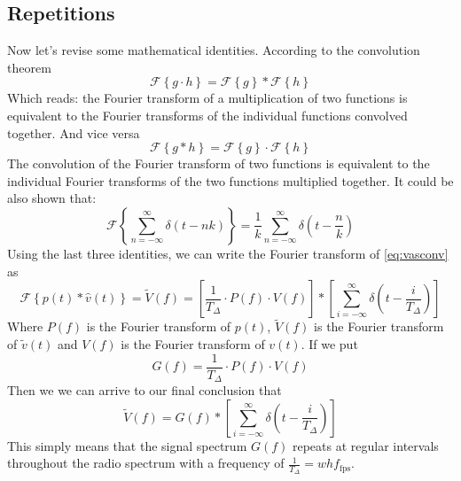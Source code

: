 \documentclass[a4paper,12pt,twoside,openright]{report}
\begin{document}
\subsection{Repetitions}
Now let's revise some mathematical identities. According to the convolution theorem \cite{arfkenconvolution}
\begin{equation}
\mathcal{F} \left\{ g \cdot h \right\} = \mathcal{F} \left\{ g \right\} \ast  \mathcal{F} \left\{ h \right\}
\end{equation}
Which reads: the Fourier transform of a multiplication of two functions is equivalent to the Fourier transforms of the individual functions convolved together. And vice versa
\begin{equation}
\mathcal{F} \left\{ g \ast h \right\} = \mathcal{F} \left\{ g \right\} \cdot  \mathcal{F} \left\{ h \right\}
\end{equation}
The convolution of the Fourier transform of two functions is equivalent to the individual Fourier transforms of the two functions multiplied together.
It could be also shown that:
\begin{equation}
\mathcal{F} \left\{ \sum\limits_{n=-\infty}^{\infty}  \delta(t-n k) \right\} = \frac{1}{k} \sum\limits_{n=-\infty}^{\infty}  \delta \left( t-\frac{n}{k} \right)
\end{equation}
Using the last three identities, we can write the Fourier transform of \ref{eq:vasconv} as
\begin{equation} 
\mathcal{F} \left\{ p(t) \ast \hat{v}(t) \right\} = \tilde{V}(f) =
\left[ \frac{1}{T_{\Delta}} \cdot P(f) \cdot V(f) \right] \ast
\left[ \sum\limits_{i=-\infty}^{\infty}  \delta \left( t-\frac{i}{T_{\Delta}} \right) \right]
\end{equation}
Where $P(f)$ is the Fourier transform of $p(t)$, $\tilde{V}(f)$ is the Fourier transform of $\tilde{v}(t)$ and $V(f)$ is the Fourier transform of $v(t)$. If we put 
\begin{equation} 
\label{eq:gfdef}
G(f) = \frac{1}{T_{\Delta}} \cdot P(f) \cdot V(f)
\end{equation}
Then we we can arrive to our final conclusion that
\begin{equation}
\label{eq:vspectrum}
\tilde{V}(f) = G(f) \ast
\left[ \sum\limits_{i=-\infty}^{\infty}  \delta \left( t-\frac{i}{T_{\Delta}} \right) \right]
\end{equation}
This simply means that the signal spectrum $G(f)$ repeats at regular intervals throughout the radio spectrum with a frequency of $\frac{1}{T_{\Delta}} = w h f_\text{fps}$.
\end{document}
